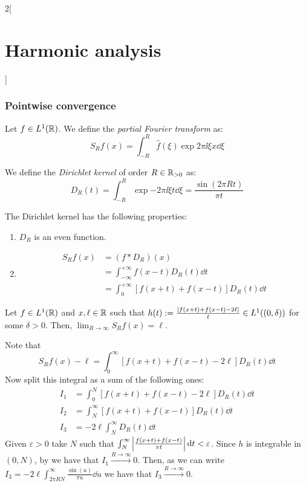 \documentclass[../../../main_math.tex]{subfiles}
\begin{document}
\begin{multicols}{2}[\section{Harmonic analysis}]
  \subsubsection{Pointwise convergence}
  \begin{definition}
    Let $f\in L^1(\mathbb{R})$. We define the \emph{partial Fourier transform} as: $$S_Rf(x)=\int_{-R}^{R}\widehat{f}(\xi)\exp{2\pi\ii \xi x}\dd{\xi}$$
  \end{definition}
  \begin{definition}
    We define the \emph{Dirichlet kernel} of order $R\in\mathbb{R}_{>0}$ as: $$D_R(t)=\int_{-R}^{R}\exp{-2\pi\ii \xi t}\dd{\xi}=\frac{\sin(2\pi Rt)}{\pi t}$$
  \end{definition}
  \begin{proposition}
    The Dirichlet kernel has the following properties:
    \begin{enumerate}
      \item $D_R$ is an even function.
      \item \begin{align*}
              S_Rf(x) & =(f*D_R)(x)                                  \\
                      & =\int_{-\infty}^{+\infty}f(x-t)D_R(t)\dd{t}  \\
                      & =\int_0^{+\infty}[f(x+t)+f(x-t)]D_R(t)\dd{t}
            \end{align*}
    \end{enumerate}
  \end{proposition}
  \begin{theorem}\label{HA:dini}
    Let $f\in L^1(\mathbb{R})$ and $x,\ell\in \mathbb{R}$ such that $h(t):=\frac{\abs{f(x+t)+f(x-t)-2\ell}}{t}\in L^1((0,\delta))$ for some $\delta>0$. Then, $\displaystyle\lim_{R\to\infty}S_Rf(x)=\ell$.
  \end{theorem}
  \begin{sproof}
    Note that $$S_Rf(x)-\ell=\int_0^\infty[f(x+t)+f(x-t)-2\ell]D_R(t)\dd{t}$$ Now split this integral as a sum of the following ones:
    \begin{align*}
      I_1 & =\int_0^N[f(x+t)+f(x-t)-2\ell]D_R(t)\dd{t} \\
      I_2 & =\int_N^\infty[f(x+t)+f(x-t)]D_R(t)\dd{t}  \\
      I_3 & =-2\ell \int_N^\infty D_R(t)\dd{t}
    \end{align*}
    Given $\varepsilon>0$ take $N$ such that $\int_N^\infty\abs{\frac{f(x+t)+f(x-t)}{\pi t}}\dd{t}<\varepsilon$. Since $h$ is integrable in $(0,N)$, by  we have that $I_1\overset{R\to\infty}{\longrightarrow}0$. Then, as we can write $I_3=-2\ell \int_{2\pi RN}^\infty \frac{\sin(u)}{\pi u}\dd{u}$ we have that $I_3\overset{R\to\infty}{\longrightarrow}0$.

\end{sproof}
\end{multicols}
\end{document}
